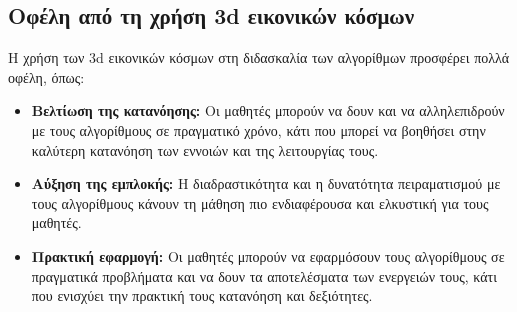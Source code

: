 
\subsection{Οφέλη από τη χρήση \acrshort{3d} εικονικών κόσμων}

Η χρήση των \acrshort{3d} εικονικών κόσμων στη διδασκαλία των αλγορίθμων προσφέρει πολλά οφέλη, όπως:

\begin{itemize}
    \item \textbf{Βελτίωση της κατανόησης:} Οι μαθητές μπορούν να δουν και να αλληλεπιδρούν με τους αλγορίθμους σε πραγματικό χρόνο, κάτι που μπορεί να βοηθήσει στην καλύτερη κατανόηση των εννοιών και της λειτουργίας τους\cite{crepinsek_note_2012}.
    \item \textbf{Αύξηση της εμπλοκής:} Η διαδραστικότητα και η δυνατότητα πειραματισμού με τους αλγορίθμους κάνουν τη μάθηση πιο ενδιαφέρουσα και ελκυστική για τους μαθητές\cite{bodner_role_1987}.
    \item \textbf{Πρακτική εφαρμογή:} Οι μαθητές μπορούν να εφαρμόσουν τους αλγορίθμους σε πραγματικά προβλήματα και να δουν τα αποτελέσματα των ενεργειών τους, κάτι που ενισχύει την πρακτική τους κατανόηση και δεξιότητες\cite{__2017}.
\end{itemize}
